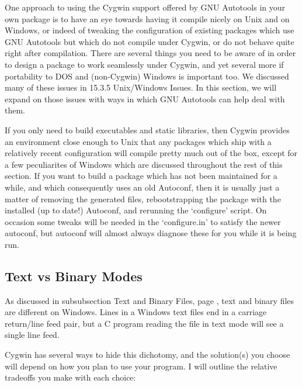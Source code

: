 One approach to using the Cygwin support offered by GNU Autotools in your own package is to have an eye towards having it compile nicely on Unix and on Windows, or indeed of tweaking the configuration of existing packages which use GNU Autotools but which do not compile under Cygwin, or do not behave quite right after compilation. There are several things you need to be aware of in order to design a package to work seamlessly under Cygwin, and yet several more if portability to DOS and (non-Cygwin) Windows is important too. We discussed many of these issues in 15.3.5 Unix/Windows Issues. In this section, we will expand on those issues with ways in which GNU Autotools can help deal with them.

If you only need to build executables and static libraries, then Cygwin provides an environment close enough to Unix that any packages which ship with a relatively recent configuration will compile pretty much out of the box, except for a few peculiarites of Windows which are discussed throughout the rest of this section. If you want to build a package which has not been maintained for a while, and which consequently uses an old Autoconf, then it is usually just a matter of removing the generated files, rebootstrapping the package with the installed (up to date!) Autoconf, and rerunning the `configure' script. On occasion some tweaks will be needed in the `configure.in' to satisfy the newer autoconf, but autoconf will almost always diagnose these for you while it is being run. 

\subsection{Text vs Binary Modes}

As discussed in subsubsection Text and Binary Files,
page \pageref{SSS_Text_and_Binary_Files}, text and binary files are different on Windows. Lines in a Windows text files end in a carriage return/line feed pair, but a C program reading the file in text mode will see a single line feed.

Cygwin has several ways to hide this dichotomy, and the solution(s) you choose will depend on how you plan to use your program. I will outline the relative tradeoffs you make with each choice:


